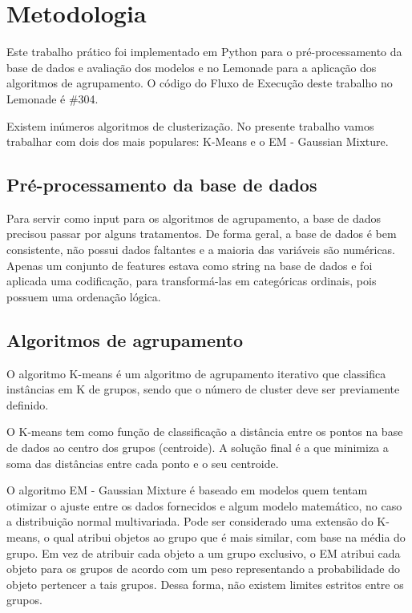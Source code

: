 \documentclass{article}
\begin{document}
\section{Metodologia}

Este trabalho prático foi implementado em Python para o pré-processamento da base de dados e avaliação dos modelos e no Lemonade para a aplicação dos algoritmos de agrupamento. O código do Fluxo de Execução deste trabalho no Lemonade é \#304.  

Existem inúmeros algoritmos de clusterização. No presente trabalho vamos trabalhar com dois dos mais populares: K-Means e o EM - Gaussian Mixture.

\subsection{Pré-processamento da base de dados}

Para servir como input para os algoritmos de agrupamento, a base de dados precisou passar por alguns tratamentos. De forma geral, a base de dados é bem consistente, não possui dados faltantes e a maioria das variáveis são numéricas. Apenas um conjunto de features estava como string na base de dados e foi aplicada uma codificação, para transformá-las em categóricas ordinais, pois possuem uma ordenação lógica.

\subsection{Algoritmos de agrupamento}

O algoritmo K-means é um algoritmo de agrupamento iterativo que classifica instâncias em K de grupos, sendo que o número de cluster deve ser previamente definido. 

O K-means tem como função de classificação a distância entre os pontos na base de dados ao centro dos grupos (centroide). A solução final é a que minimiza a soma das distâncias entre cada ponto e o seu centroide. 

O algoritmo EM - Gaussian Mixture é baseado em modelos quem tentam otimizar o ajuste entre os dados fornecidos e algum modelo matemático, no caso a distribuição normal multivariada. Pode ser considerado uma extensão do K-means, o qual atribui objetos ao grupo que é mais similar, com base na média do grupo. Em vez de atribuir cada objeto a um grupo exclusivo, o EM atribui cada objeto
para os grupos de acordo com um peso representando a probabilidade do objeto pertencer a tais grupos. Dessa forma, não existem limites estritos entre os grupos. 
\end{document}
